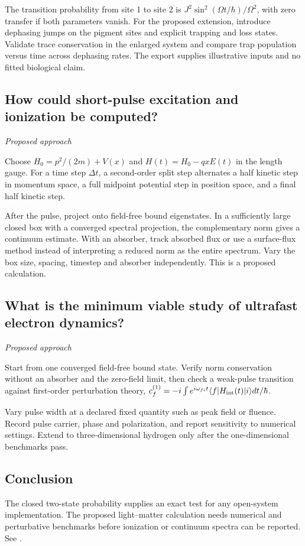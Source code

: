 \documentclass[11pt]{article}
\begin{document}
The transition probability from site 1 to site 2 is \(J^2\sin^2(\Omega t/\hbar)/\Omega^2\), with zero transfer if both parameters vanish. For the proposed extension, introduce dephasing jumps on the pigment sites and explicit trapping and loss states. Validate trace conservation in the enlarged system and compare trap population versus time across dephasing rates. The export supplies illustrative inputs and no fitted biological claim.

\subsection{How could short-pulse excitation and ionization be computed?}
\label{problem:ultrafast-method}
\textit{Proposed approach}

Choose \(H_0=p^2/(2m)+V(x)\) and \(H(t)=H_0-qxE(t)\) in the length gauge. For a time step \(\Delta t\), a second-order split step alternates a half kinetic step in momentum space, a full midpoint potential step in position space, and a final half kinetic step.

After the pulse, project onto field-free bound eigenstates. In a sufficiently large closed box with a converged spectral projection, the complementary norm gives a continuum estimate. With an absorber, track absorbed flux or use a surface-flux method instead of interpreting a reduced norm as the entire spectrum. Vary the box size, spacing, timestep and absorber independently. This is a proposed calculation.

\subsection{What is the minimum viable study of ultrafast electron dynamics?}
\label{problem:ultrafast-scope}
\textit{Proposed approach}

Start from one converged field-free bound state. Verify norm conservation without an absorber and the zero-field limit, then check a weak-pulse transition against first-order perturbation theory, \(c_f^{(1)}=-i\int e^{i\omega_{fi}t}\langle f|H_{\rm int}(t)|i\rangle dt/\hbar\).

Vary pulse width at a declared fixed quantity such as peak field or fluence. Record pulse carrier, phase and polarization, and report sensitivity to numerical settings. Extend to three-dimensional hydrogen only after the one-dimensional benchmarks pass.

\subsection*{Conclusion}
The closed two-state probability supplies an exact test for any open-system implementation. The proposed light--matter calculation needs numerical and perturbative benchmarks before ionization or continuum spectra can be reported.
See \cite{ref5}.
\end{document}
